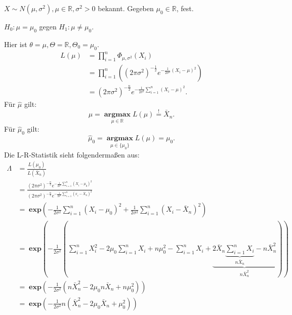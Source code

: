 \documentclass[10pt]{article}
\newcommand{\IR}{\mathbb{R}} %
\newcommand{\sni}{\sum_{i=1}^{n}} %
\newenvironment{BSP}[1][]
{\begin{Beispiel}[frametitle=#1]}{\end{Beispiel}}
\begin{document}
	\begin{BSP}[Beispiel 2.1.1 (z-Test mit zweiseitiger Alternative)]
		$X \sim N(\mu, \sigma^2), \mu \in \IR, \sigma^2 > 0$ bekannt. Gegeben $\mu_0 \in \IR$, fest.
		
		$H_0: \mu = \mu_0$ gegen $H_1: \mu \neq \mu_0$. 
		
		Hier ist $\theta = \mu, \Theta = \IR, \Theta_0 = {\mu_0}$.
		\begin{equation*}
			\begin{split}
				L(\mu) &= \prod_{i = 1}^{n} \Phi_{\mu, \sigma^2} (X_i)\\
				&= \prod_{i = 1}^{n} \left((2\pi \sigma^2)^{-\frac{1}{2}}e^{-\frac{1}{2 \sigma^2} (X_i - \mu)^2}\right)\\
				&= (2\pi \sigma^2)^{-\frac{n}{2}} e^{-\frac{1}{2\sigma^2} \sum_{i=1}^{n}(X_i -\mu)^2}.
			\end{split}
		\end{equation*}
		Für $\hat{\mu}$ gilt:
		\begin{equation*}
			\hat{\mu}= \;\underset{\mu \in \IR}{\textbf{argmax}} \; L(\mu) \overset{!}{=} \bar{X}_n.
		\end{equation*}
		Für $\hat{\mu}_0$ gilt:
		\begin{equation*}
			\hat{\mu}_0= \;\underset{\mu \in \{\mu_0\}}{\textbf{argmax}} \; L(\mu) = \mu_0.
		\end{equation*}
		Die L-R-Statistik sieht folgendermaßen aus:
		\begin{equation*}
		\begin{split}
			\Lambda &= \frac{L(\mu_0)}{L(\bar{X}_n)}\\
			&= \frac{(2 \pi \sigma^2)^{-\frac{n}{2}}e^{-\frac{1}{2 \sigma^2} \sum_{i=1}^{n}(X_i - \mu_0)^2}}{(2 \pi \sigma^2)^{-\frac{n}{2}}e^{-\frac{1}{2 \sigma^2} \sum_{i=1}^{n}(x_i - \bar{X}_n)^2}}\\
			&= \; \textbf{exp}\left(- \frac{1}{2\sigma^2}\sni (X_i - \mu_0)^2 + \frac{1}{2 \sigma^2} \sni (X_i - \bar{X}_n)^2\right)\\
			&= \; \textbf{exp} \left(- \frac{1}{2\sigma^2}(\sni X_i^2 - 2 \mu_0 \sni X_i + n\mu_0^2 - \sni X_i + \underbrace{2 \bar{X}_n \underbrace{\sni X_i}_{n \bar{X}_n} - n\bar{X}^2_n}_{n \bar{X}_n^2})\right)\\
			&= \; \textbf{exp} \left(- \frac{1}{2 \sigma^2} (n \bar{X}_n^2 - 2 \mu_0n\bar{X}_n + n\mu_0^2)\right)\\
			&= \; \textbf{exp} \left(- \frac{1}{2 \sigma^2}n (\bar{X}_n^2 - 2 \mu_0 \bar{X}_n + \mu_0^2)\right) \\

\end{split}
\end{equation*}
\end{BSP}
\end{document}
